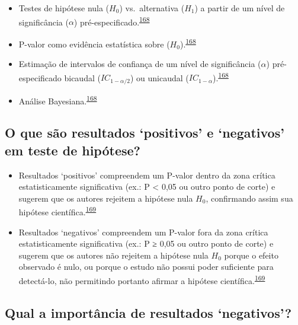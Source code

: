 \documentclass[
  a4paper,
]{book}
\begin{document}
\begin{itemize}
\item
  Testes de hipótese nula (\(H_{0}\)) vs.~alternativa (\(H_{1}\)) a partir de um nível de significância (\(\alpha\)) pré-especificado.\textsuperscript{\protect\hyperlink{ref-goodman2016}{168}}
\item
  P-valor como evidência estatística sobre (\(H_{0}\)).\textsuperscript{\protect\hyperlink{ref-goodman2016}{168}}
\item
  Estimação de intervalos de confiança de um nível de significância (\(\alpha\)) pré-especificado bicaudal (\(IC_{1-\alpha/2}\)) ou unicaudal (\(IC_{1-\alpha}\)).\textsuperscript{\protect\hyperlink{ref-goodman2016}{168}}
\item
  Análise Bayesiana.\textsuperscript{\protect\hyperlink{ref-goodman2016}{168}}
\end{itemize}

\hypertarget{o-que-suxe3o-resultados-positivos-e-negativos-em-teste-de-hipuxf3tese}{%
\subsection{O que são resultados `positivos' e `negativos' em teste de hipótese?}\label{o-que-suxe3o-resultados-positivos-e-negativos-em-teste-de-hipuxf3tese}}

\begin{itemize}
\item
  Resultados `positivos' compreendem um P-valor dentro da zona crítica estatisticamente significativa (ex.: P \textless{} 0,05 ou outro ponto de corte) e sugerem que os autores rejeitem a hipótese nula \(H_{0}\), confirmando assim sua hipótese científica.\textsuperscript{\protect\hyperlink{ref-greenhalgh1997a}{169}}
\item
  Resultados `negativos' compreendem um P-valor fora da zona crítica estatisticamente significativa (ex.: P ≥ 0,05 ou outro ponto de corte) e sugerem que os autores não rejeitem a hipótese nula \(H_{0}\) porque o efeito observado é nulo, ou porque o estudo não possui poder suficiente para detectá-lo, não permitindo portanto afirmar a hipótese científica.\textsuperscript{\protect\hyperlink{ref-greenhalgh1997a}{169}}
\end{itemize}

\hypertarget{qual-a-importuxe2ncia-de-resultados-negativos}{%
\subsection{Qual a importância de resultados `negativos'?}\label{qual-a-importuxe2ncia-de-resultados-negativos}}
\end{document}

